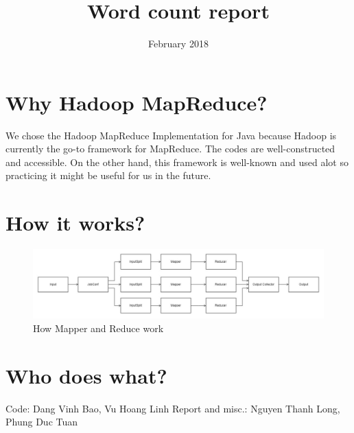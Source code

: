 \documentclass{article}
\title{Word count report}
\date{February 2018}
\begin{document}
\maketitle

\section{Why Hadoop MapReduce?}
We chose the Hadoop MapReduce Implementation for Java because Hadoop is currently the go-to framework for MapReduce. The codes are well-constructed and accessible. On the other hand, this framework is well-known and used alot so practicing it might be useful for us in the future.

\section{How it works?}
\begin{figure}[h!]
\centering
\includegraphics[scale=1.7]{04.mapreduce_flowchart.jpg}
\caption{How Mapper and Reduce work}
\label{fig:mapreducefigure}
\end{figure}

\section{Who does what?}
Code: Dang Vinh Bao, Vu Hoang Linh
Report and misc.: Nguyen Thanh Long, Phung Duc Tuan
\end{document}
